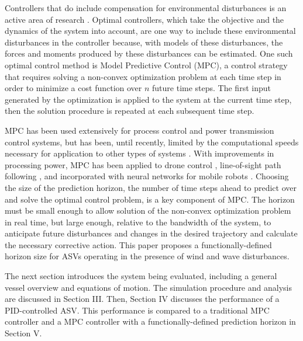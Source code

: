 \documentclass[letterpaper, 10 pt, conference]{ieeeconf}  %
\begin{document}
Controllers that do include compensation for environmental disturbances is an active area of research \cite{Das:15a,Perez:11a,Fossen:11c}. Optimal controllers, which take the objective and the dynamics of the system into account, are one way to include these environmental disturbances in the controller because, with models of these disturbances, the forces and moments produced by these disturbances can be estimated. One such optimal control method is Model Predictive Control (MPC), a control strategy that requires solving a non-convex optimization problem at each time step in order to minimize a cost function over $n$ future time steps. The first input generated by the optimization is applied to the system at the current time step, then the solution procedure is repeated at each subsequent time step.

MPC has been used extensively for process control and power transmission control systems, but has been, until recently, limited by the computational speeds necessary for application to other types of systems \cite{Qin:03a, Morari:99a, Garcia:89a}. With improvements in processing power, MPC has been applied to drone control \cite{Mahe:18a, Falanga:18a}, line-of-sight path following \cite{Oh:10a}, and incorporated with neural networks for mobile robots \cite{Li:16a}. Choosing the size of the prediction horizon, the number of time steps ahead to predict over and solve the optimal control problem, is a key component of MPC. The horizon must be small enough to allow solution of the non-convex optimization problem in real time, but large enough, relative to the bandwidth of the system, to anticipate future disturbances and changes in the desired trajectory and calculate the necessary corrective action. This paper proposes a functionally-defined horizon size for ASVs operating in the presence of wind and wave disturbances.

The next section introduces the system being evaluated, including a general vessel overview and equations of motion. The simulation procedure and analysis are discussed in Section III. Then, Section IV discusses the performance of a PID-controlled ASV. This performance is compared to a traditional MPC controller and a MPC controller with a functionally-defined prediction horizon in Section V.
%
\end{document}

